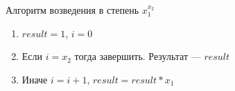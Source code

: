 Алгоритм возведения в степень $x_1^{x_2}$
\begin{enumerate}
 \item $result = 1$, $i=0$
 \item Если $i=x_2$ тогда завершить. Результат --- $result$
 \item Иначе $i=i+1$, $result = result * x_1$
\end{enumerate}
